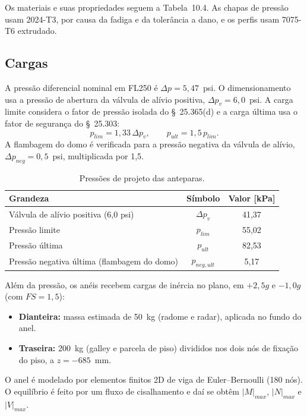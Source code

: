 Os materiais e suas propriedades seguem a Tabela~10.4. As chapas de pressão usam 2024-T3, por causa da fadiga e da tolerância a dano, e os perfis usam 7075-T6 extrudado.

\subsection{Cargas}

A pressão diferencial nominal em FL250 é $\Delta p = 5{,}47$~psi. O dimensionamento usa a pressão de abertura da válvula de alívio positiva, $\Delta p_{v} = 6{,}0$~psi. A carga limite considera o fator de pressão isolada do \S~25.365(d) e a carga última usa o fator de segurança do \S~25.303:
\begin{equation}
    p_{lim} = 1{,}33\,\Delta p_{v}, \qquad p_{ult} = 1{,}5\,p_{lim}.
\end{equation}
A flambagem do domo é verificada para a pressão negativa da válvula de alívio, $\Delta p_{neg} = 0{,}5$~psi, multiplicada por 1,5.

\begin{table}[htbp]
    \centering
    \caption{Pressões de projeto das anteparas.}
    \label{tab:bulk_pressoes}
    \begin{tabular}{lcc}
        \toprule
        Grandeza & Símbolo & Valor [kPa] \\
        \midrule
        Válvula de alívio positiva (6,0 psi) & $\Delta p_{v}$ & 41,37 \\
        Pressão limite & $p_{lim}$ & 55,02 \\
        Pressão última & $p_{ult}$ & 82,53 \\
        Pressão negativa última (flambagem do domo) & $p_{neg,ult}$ & 5,17 \\
        \bottomrule
    \end{tabular}
\end{table}

Além da pressão, os anéis recebem cargas de inércia no plano, em $+2{,}5g$ e $-1{,}0g$ (com $FS = 1{,}5$):
\begin{itemize}
    \item \textbf{Dianteira:} massa estimada de 50~kg (radome e radar), aplicada no fundo do anel.
    \item \textbf{Traseira:} 200~kg (galley e parcela de piso) divididos nos dois nós de fixação do piso, a $z = -685$~mm.
\end{itemize}
O anel é modelado por elementos finitos 2D de viga de Euler--Bernoulli (180 nós). O equilíbrio é feito por um fluxo de cisalhamento e daí se obtêm $|M|_{max}$, $|N|_{max}$ e $|V|_{max}$.

